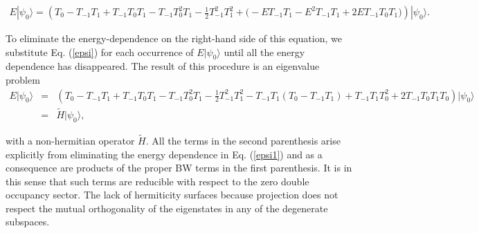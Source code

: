 \documentclass[floatfix,twocolumn,aps,prb,showpacs,superscriptaddress]{revtex4}
\newcommand{\beq}{\begin{eqnarray}}
\newcommand{\eeq}{\end{eqnarray}
}\def\tm{T_{-1}}
\begin{document}
\begin{widetext}
\beq\label{epsi1}
E|\psi_0\rangle=\left(
T_0-T_{-1}T_1+T_{-1}T_0T_1-T_{-1}T_0^2T_1-\frac12T_{-1}^2T_1^2 
+\bigg(-ET_{-1}T_1-E^2T_{-1}T_1+2ET_{-1}T_0T_1\bigg)\right)|\psi_0\rangle.
\eeq
To eliminate the energy-dependence on the right-hand side of this
equation, we substitute Eq. (\ref{epsi}) for each occurrence of
$E|\psi_0\rangle$ until all the energy dependence has disappeared.
The result of this procedure is an eigenvalue problem
\beq
E|\psi_0\rangle&=&\left(T_0-T_{-1}T_1+T_{-1}T_0T_1-T_{-1}T_0^2T_1-\frac12T_{-1}^2T_1^2%
-T_{-1}T_1(T_0-T_{-1}T_1)+T_{-1}T_1T_0^2+
2T_{-1}T_0T_1T_0\right)|\psi_0\rangle\nonumber\\  
&=&\widetilde{H}|\psi_0\rangle ,
\eeq
\end{widetext}
with a non-hermitian operator $\widetilde{H}$. All the terms in the
second parenthesis arise explicitly from eliminating the energy
dependence in Eq. (\ref{epsi1}) and as a consequence are products of
the proper BW terms in the first parenthesis. It is in this sense that
such terms are reducible with respect to the zero double occupancy
sector. The lack of hermiticity surfaces because projection does not
respect the mutual orthogonality of the eigenstates in any of the
degenerate subspaces. 
\end{document}
